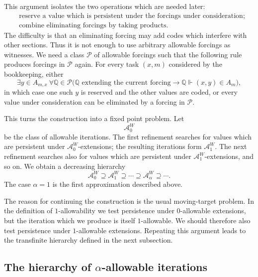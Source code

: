 \documentclass[a4paper,11pt]{article}
\newcommand{\forceQ}{\mathbb{Q}}
\begin{document}
This argument isolates the two operations which are needed later:
\begin{equation}
\label{two-operations-uniformization}
\begin{split}
   &\text{reserve a value which is persistent under the forcings under consideration;}\\
   &\text{combine eliminating forcings by taking products.}
\end{split}
\end{equation}
The difficulty is that an eliminating forcing may add codes which interfere with other sections.  Thus it is not enough to use arbitrary allowable forcings as witnesses.  We need a class $\mathcal P$ of allowable forcings such that the following rule produces forcings in $\mathcal P$ again.  For every task $(x,m)$ considered by the bookkeeping, either
\[
   \exists y\in A_{m,x}\ \forall\forceQ\in\mathcal P
   \bigl(\forceQ\text{ extending the current forcing}\rightarrow
   \forceQ\Vdash(x,y)\in A_m\bigr),
\]
in which case one such $y$ is reserved and the other values are coded, or every value under consideration can be eliminated by a forcing in $\mathcal P$.

This turns the construction into a fixed point problem.  Let
\[
   \mathcal A^W_0
\]
be the class of allowable iterations.  The first refinement searches for values which are persistent under $\mathcal A^W_0$-extensions; the resulting iterations form $\mathcal A^W_1$.  The next refinement searches also for values which are persistent under $\mathcal A^W_1$-extensions, and so on.  We obtain a decreasing hierarchy
\[
   \mathcal A^W_0\supseteq\mathcal A^W_1\supseteq\cdots
   \supseteq\mathcal A^W_\alpha\supseteq\cdots.
\]
The case $\alpha=1$ is the first approximation described above. 

The reason for continuing the construction is the usual moving-target problem.  In the definition of $1$-allowability we test persistence under $0$-allowable extensions, but the iteration which we produce is itself $1$-allowable.  We should therefore also test persistence under $1$-allowable extensions.  Repeating this argument leads to the transfinite hierarchy defined in the next subsection.


\subsection[The hierarchy of alpha-allowable iterations]{The hierarchy of $\alpha$-allowable iterations}
\label{subsection-alpha-allowability}
\end{document}
